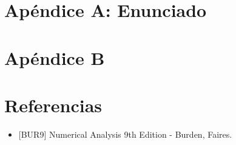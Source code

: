 \section{Apéndice A: Enunciado}


\section{Apéndice B}

\section{Referencias}

\begin{itemize}
\item $[$BUR9$]$ Numerical Analysis 9th Edition - Burden, Faires.
\end{itemize}